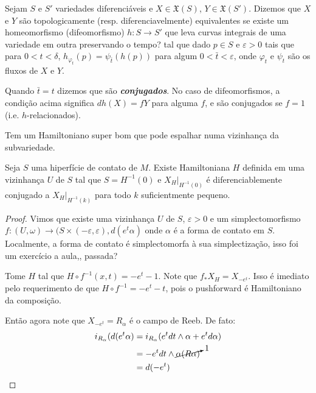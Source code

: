 \begin{defn}\leavevmode
	Sejam $S$ e $S'$ variedades diferenciáveis e  $X\in\mathfrak{X}(S)$, $Y\in\mathfrak{X}(S')$. Dizemos que $X$ e $Y$ são topologicamente (resp. diferenciavelmente) equivalentes se existe um homeomorfismo (difeomorfismo) $h:S\to S'$ {\color{5}que leva curvas integrais de uma variedade em outra preservando o tempo?} tal que dado $p\in S$ e $\varepsilon>0$ tais que para $0<t<\delta$, $h_{\varphi_t}(p)=\psi_{\bar{t}}(h(p))$ para algum $0<\bar{t}<\varepsilon$, onde $\varphi_t$ e $\psi_t$ são os fluxos de $X$ e $Y$.

	Quando $\bar{t} =t$ dizemos que são \textit{\textbf{conjugados}}. No caso de difeomorfismos, a  condição acima significa $dh(X)=fY$ para alguma $f$, e são conjugados se $f=1$ (i.e. $h$-relacionados).
\end{defn}

\begin{upshot}\leavevmode
	Tem um Hamiltoniano super bom que pode espalhar numa vizinhança  da subvariedade.
\end{upshot}

\begin{prop}\leavevmode
	Seja $S$ uma hiperfície de contato de  $M$. Existe Hamiltoniana $H$ definida em uma vizinhança $U$ de $S$ tal que $S=H^{-1}(0)$ e $X_H|_{H^{-1}(0)}$ é diferenciablemente conjugado a $X_{H}|_{H^{-1}(k)}$ para todo $k$ suficientmente pequeno.
\end{prop}

\begin{proof}\leavevmode
	Vimos que existe uma vizinhança $U$ de $S$, $\varepsilon>0$ e um simplectomorfismo $f:(U,\omega)\to(S\times (-\varepsilon,\varepsilon), d(e^t\alpha)$ onde $\alpha$ é a forma de contato em $S$. {\color{5}Localmente, a forma de contato é simplectomorfa à sua simplectização, isso foi um exercício a aula,, passada?}

	Tome $H$ tal que $H\circ f^{-1}(x,t)=-e^t-1$. Note que $f_*X_H=X_{-e^t}$. {\color{4}Isso é imediato pelo requerimento de que $H\circ f^{-1}=-e^t-t$, pois o pushforward é Hamiltoniano da composição.}

	Então agora note que $X_{-e^t}=R_{\alpha}$ é o campo de Reeb. De fato:
	\begin{align*}
		i_{R_\alpha}(d(e^t\alpha)&=i_{R_\alpha}(e^tdt\wedge \alpha+e^t d\alpha)\\
&=-e^tdt\wedge \cancelto{1}{\alpha(R\alpha)}\\
&=d(-e^t)
	\end{align*}
\end{proof}

